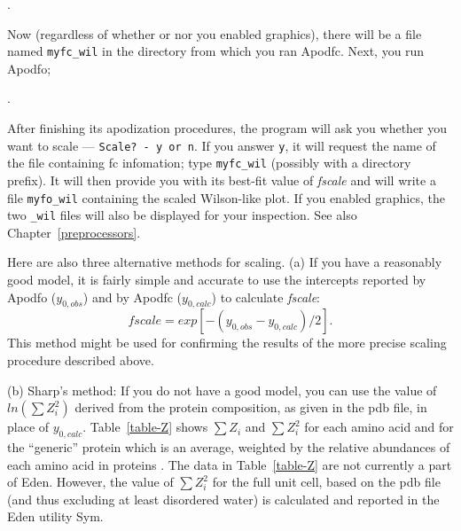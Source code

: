\documentclass{report}
\begin{document}
.

Now (regardless of whether or nor you enabled graphics), there will be a file 
named {\tt myfc\_wil} in the directory from which you ran Apodfc.  
Next, you run Apodfo;

.

After finishing its apodization procedures, the program will ask you
whether you want to scale --- {\tt Scale? - y or n}.  If you answer {\tt y},
it will request the name of the file containing fc infomation; type 
{\tt myfc\_wil} (possibly with a directory prefix).  It will then provide you
with its best-fit value of {\it fscale} and will write a file {\tt myfo\_wil}
containing the scaled Wilson-like plot.  If you enabled graphics, the two 
{\tt \_wil} files will also be displayed for your inspection.
 See also Chapter~\ref{preprocessors}.

\vspace {0.1in}

Here are also three alternative methods for scaling.
(a) If you have a reasonably good model, it is fairly
simple and accurate to use the intercepts reported by Apodfo
($y_{0,obs}$) and by Apodfc ($y_{0,calc}$) to calculate {\it fscale}:
$$ fscale = exp[-(y_{0,obs} - y_{0,calc}) / 2]. $$
This method might be used for confirming the results of the more precise
scaling procedure described above.

(b)  Sharp's method: If you do not have a good model, you can use
the value of $ln(\sum{Z_i^2})$ derived from
the protein composition, as given in the pdb file,
in place of $y_{0,calc}$. 
Table~\ref{table-Z} shows $\sum{Z_i}$ and $\sum{Z_i^2}$ 
for each amino acid and for the ``generic'' protein
which is an average, weighted by the relative abundances
of each amino acid in proteins \cite{creighton}.
The data in Table~\ref{table-Z} are not currently
a part of Eden.  However, the value of $\sum{Z_i^2}$ for the full unit cell,
based on the pdb file (and thus excluding at least disordered 
water) is calculated and reported in the Eden utility Sym.
\end{document}
